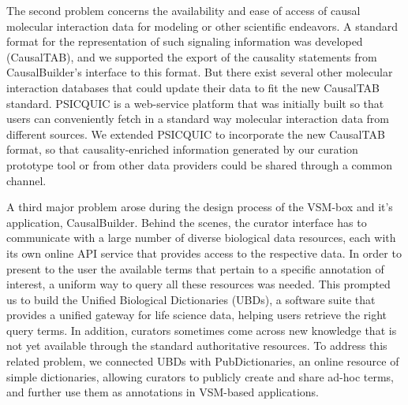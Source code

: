 \documentclass[
  12pt,
]{book}
\begin{document}
The second problem concerns the availability and ease of access of causal molecular interaction data for modeling or other scientific endeavors.
A standard format for the representation of such signaling information was developed (CausalTAB), and we supported the export of the causality statements from CausalBuilder's interface to this format.
But there exist several other molecular interaction databases that could update their data to fit the new CausalTAB standard.
PSICQUIC is a web-service platform that was initially built so that users can conveniently fetch in a standard way molecular interaction data from different sources.
We extended PSICQUIC to incorporate the new CausalTAB format, so that causality-enriched information generated by our curation prototype tool or from other data providers could be shared through a common channel.

A third major problem arose during the design process of the VSM-box and it's application, CausalBuilder.
Behind the scenes, the curator interface has to communicate with a large number of diverse biological data resources, each with its own online API service that provides access to the respective data.
In order to present to the user the available terms that pertain to a specific annotation of interest, a uniform way to query all these resources was needed.
This prompted us to build the Unified Biological Dictionaries (UBDs), a software suite that provides a unified gateway for life science data, helping users retrieve the right query terms.
In addition, curators sometimes come across new knowledge that is not yet available through the standard authoritative resources.
To address this related problem, we connected UBDs with PubDictionaries, an online resource of simple dictionaries, allowing curators to publicly create and share ad-hoc terms, and further use them as annotations in VSM-based applications.
\end{document}
